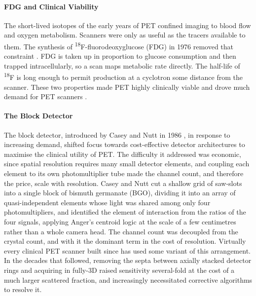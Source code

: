 \paragraph{FDG and Clinical Viability}
The short-lived isotopes of the early years of PET confined imaging to blood flow and oxygen metabolism.
Scanners were only as useful as the tracers available to them.
The synthesis of \textsuperscript{18}F-fluorodeoxyglucose (FDG) in 1976 removed that constraint \cite{Ido1978}.
FDG is taken up in proportion to glucose consumption and then trapped intracellularly, so a scan maps metabolic rate directly.
The  half-life of \textsuperscript{18}F is long enough to permit production at a cyclotron some distance from the scanner.
These two properties made PET highly clinically viable and drove much demand for PET scanners .

\paragraph{The Block Detector}
The block detector, introduced by Casey and Nutt in 1986 \cite{Casey1986}, in response to increasing demand, shifted focus towards cost-effective detector architectures to maximise the clinical utility of PET.
The difficulty it addressed was economic, since spatial resolution requires many small detector elements, and coupling each element to its own photomultiplier tube made the channel count, and therefore the price, scale with resolution.
Casey and Nutt cut a shallow grid of saw-slots into a single block of bismuth germanate (BGO), dividing it into an array of quasi-independent elements whose light was shared among only four photomultipliers, and identified the element of interaction from the ratios of the four signals, applying Anger's centroid logic at the scale of a few centimetres rather than a whole camera head.
The channel count was decoupled from the crystal count, and with it the dominant term in the cost of resolution.
Virtually every clinical PET scanner built since has used some variant of this arrangement.
In the decades that followed, removing the septa between axially stacked detector rings and acquiring in fully-3D raised sensitivity several-fold at the cost of a much larger scattered fraction, and increasingly necessitated corrective algorithms to resolve it.

